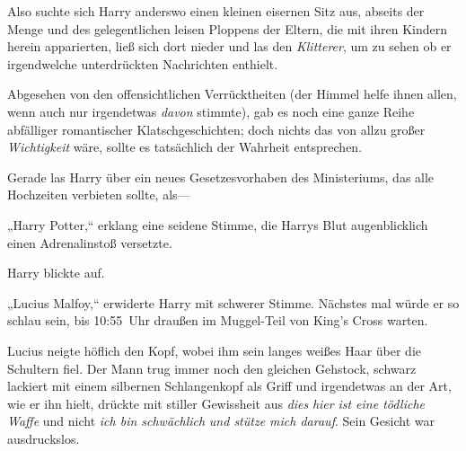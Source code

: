 Also suchte sich Harry anderswo einen kleinen eisernen Sitz aus, abseits der Menge und des gelegentlichen leisen Ploppens der Eltern, die mit ihren Kindern herein apparierten, ließ sich dort nieder und las den \emph{Klitterer}, um zu sehen ob er irgendwelche unterdrückten Nachrichten enthielt.

Abgesehen von den offensichtlichen Verrücktheiten (der Himmel helfe ihnen allen, wenn auch nur irgendetwas \emph{davon} stimmte), gab es noch eine ganze Reihe abfälliger romantischer Klatschgeschichten; doch nichts das von allzu großer \emph{Wichtigkeit} wäre, sollte es tatsächlich der Wahrheit entsprechen.

Gerade las Harry über ein neues Gesetzesvorhaben des Ministeriums, das alle Hochzeiten verbieten sollte, als—

„Harry Potter,“ erklang eine seidene Stimme, die Harrys Blut augenblicklich einen Adrenalinstoß versetzte.

Harry blickte auf.

„Lucius Malfoy,“ erwiderte Harry mit schwerer Stimme. Nächstes mal würde er so schlau sein, bis 10:55~Uhr draußen im Muggel-Teil von King's Cross warten.

Lucius neigte höflich den Kopf, wobei ihm sein langes weißes Haar über die Schultern fiel. Der Mann trug immer noch den gleichen Gehstock, schwarz lackiert mit einem silbernen Schlangenkopf als Griff und irgendetwas an der Art, wie er ihn hielt, drückte mit stiller Gewissheit aus \emph{dies} \emph{hier} \emph{ist eine tödliche Waffe} und nicht \emph{ich bin schwächlich} \emph{und stütze mich darauf}. Sein Gesicht war ausdruckslos.

